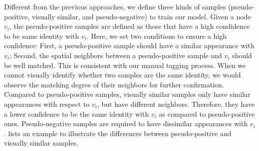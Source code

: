 \documentclass[10pt,twocolumn,letterpaper]{article}
\begin{document}
Different from the previous approaches, we define three kinds of samples (pseudo-positive, visually similar, and pseudo-negative) to train our model.
Given a node $v_i$, the pseudo-positive samples are defined as those that have a high condidence to be same identity with $v_i$.
Here, we set two conditions to ensure a high confidence: 
First, a pseudo-positive sample should have a similar appearance with $v_i$;
Second, the spatial neighbors between a pseudo-positive sample and $v_i$ should be well matched.
This is consistent with our manual tagging process. 
When we cannot visually identify whether two samples are the same identity, we would observe the matching degree of their neighbors for further confirmation.
Compared to pseudo-positive samples, visually similar samples only have similar appearances with respect to $v_i$, but have different neighbors.
Therefore, they have a lower confidence to be the same identity with $v_i$ as compared to pseudo-positive ones.
Pseudo-negative samples are required to have dissimilar appearances with $v_i$.
 lists an example to illustrate the differences between pseudo-positive and visually similar samples. 
\end{document}
